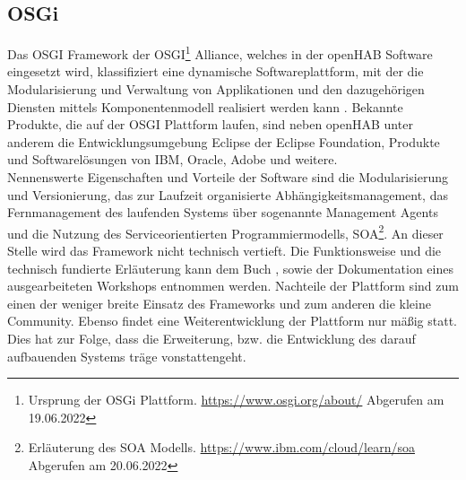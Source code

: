     \subsection{OSGi}
    \label{subsec:osgiFramework}
        Das \ac{OSGI} Framework der \acs{OSGI}\footnote{Ursprung der OSGi Plattform. \url{https://www.osgi.org/about/} Abgerufen am 19.06.2022} 
        Alliance, welches in der openHAB Software eingesetzt wird, klassifiziert eine dynamische Softwareplattform, mit der die Modularisierung 
        und Verwaltung von Applikationen und den dazugehörigen Diensten mittels Komponentenmodell realisiert werden kann \cite{funke2009}. Bekannte 
        Produkte, die auf der \acs{OSGI} Plattform laufen, sind neben openHAB unter anderem die Entwicklungsumgebung Eclipse der Eclipse 
        Foundation, Produkte und Softwarelösungen von IBM, Oracle, Adobe und weitere. 
        \\
        Nennenswerte Eigenschaften und Vorteile der Software sind die Modularisierung und Versionierung, das zur Laufzeit organisierte 
        Abhängigkeitsmanagement, das Fernmanagement des laufenden Systems über sogenannte Management Agents und die Nutzung des 
        Serviceorientierten Programmiermodells, \ac{SOA}\footnote{Erläuterung des SOA Modells. \url{https://www.ibm.com/cloud/learn/soa} Abgerufen am 20.06.2022}. 
        An dieser Stelle wird das Framework nicht technisch vertieft. Die Funktionsweise und die technisch 
        fundierte Erläuterung kann dem Buch \cite{osgibuch}, sowie der Dokumentation \cite{osgipraesentation} eines ausgearbeiteten Workshops entnommen werden. 
        Nachteile der Plattform sind zum einen der weniger breite Einsatz des Frameworks und zum anderen die kleine Community. 
        Ebenso findet eine Weiterentwicklung der Plattform nur mäßig statt. Dies hat zur Folge, dass die Erweiterung, bzw. die Entwicklung des darauf 
        aufbauenden Systems träge vonstattengeht. 

